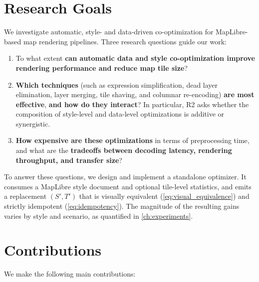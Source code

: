 \section{Research Goals}\label{sec:research_goals}

We investigate automatic, style- and data-driven co-optimization for MapLibre-based map rendering pipelines.
Three research questions guide our work:

\begin{enumerate}[label=\textbf{R\arabic*}]
    \item To what extent \textbf{can automatic data and style co-optimization improve rendering performance and reduce map tile size}?
    \item \textbf{Which techniques} (such as expression simplification, dead layer elimination, layer merging, tile shaving, and columnar re-encoding) \textbf{are most effective}, \textbf{and how do they interact}?  In particular, R2 asks whether the composition of style-level and data-level optimizations is additive or synergistic.
    \item \textbf{How expensive are these optimizations} in terms of preprocessing time, and what are the \textbf{tradeoffs between decoding latency, rendering throughput, and transfer size}?
\end{enumerate}

To answer these questions, we design and implement a standalone optimizer.
It consumes a MapLibre style document and optional tile-level statistics, and emits a replacement $(S', T')$ that is visually equivalent (\cref{eq:visual_equivalence}) and strictly idempotent (\cref{eq:idempotency}).
The magnitude of the resulting gains varies by style and scenario, as quantified in \cref{ch:experiments}.

\newpage
\section{Contributions}\label{sec:contributions}

We make the following main contributions:

